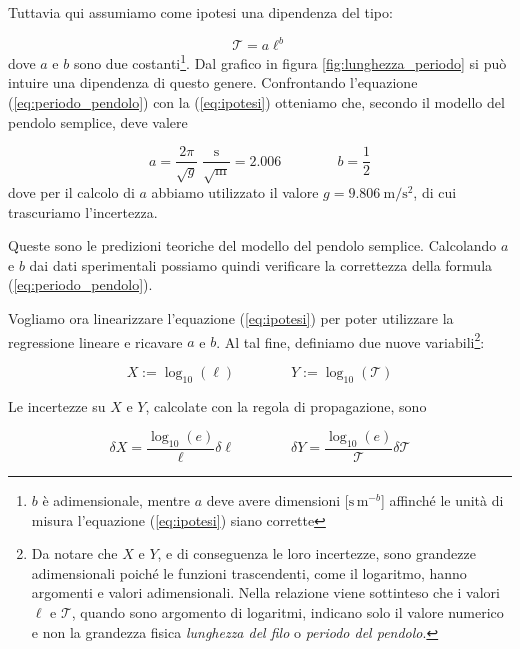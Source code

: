 Tuttavia qui assumiamo come ipotesi una dipendenza del tipo:

\begin{equation}
    \mathcal{T} = a\ell^b
    \label{eq:ipotesi}
\end{equation}
%
dove $a$ e $b$ sono due costanti\footnote{$b$ è adimensionale, mentre $a$ deve avere dimensioni [$\text{s}\,\text{m}^{-b}$] affinché le unità di misura l'equazione (\ref{eq:ipotesi}) siano corrette}.
Dal grafico in figura \ref{fig:lunghezza_periodo} si può intuire una dipendenza di questo genere.
Confrontando l'equazione (\ref{eq:periodo_pendolo}) con la (\ref{eq:ipotesi}) otteniamo che, secondo il modello
del pendolo semplice, deve valere

\begin{equation}
    a = \frac{2\pi}{\sqrt{g}} \; \frac{\text{s}}{\sqrt{\text{m}}} = 2.006 \qquad \qquad b = \frac{1}{2}
\end{equation}
%
dove per il calcolo di $a$ abbiamo utilizzato il valore $g = \SI{9.806}{\meter\per\square\second}$, di cui trascuriamo l'incertezza.

Queste sono le predizioni teoriche del modello del pendolo semplice. Calcolando $a$ e $b$ dai dati sperimentali
possiamo quindi verificare la correttezza della formula (\ref{eq:periodo_pendolo}).

Vogliamo ora linearizzare l'equazione (\ref{eq:ipotesi}) per poter utilizzare la regressione lineare e ricavare $a$ e $b$.
Al tal fine, definiamo due nuove variabili\footnote{Da notare che $X$ e $Y$, e di conseguenza le loro incertezze,
sono grandezze adimensionali poiché
le funzioni trascendenti, come il logaritmo, hanno argomenti e valori adimensionali. Nella relazione viene sottinteso
che i valori $\ell$ e $\mathcal{T}$, quando sono argomento di logaritmi, indicano solo il valore numerico e non la grandezza fisica
\emph{lunghezza del filo} o \emph{periodo del pendolo}.}:

\begin{equation}
    X := \log_{10}{(\ell)} \qquad \qquad Y := \log_{10}{(\mathcal{T})}
    \label{eq:vars}
\end{equation}

Le incertezze su $X$ e $Y$, calcolate con la regola di propagazione, sono

\begin{equation}
    \delta X = \frac{\log_{10}(e)}{\ell}\delta \ell
    \qquad \qquad
    \delta Y = \frac{\log_{10}(e)}{\mathcal{T}}\delta\mathcal{T}
    \label{eq:delta_XY}
\end{equation}

